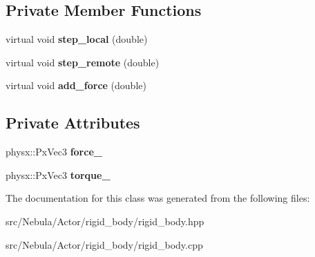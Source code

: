\subsection*{\-Private \-Member \-Functions}
\begin{DoxyCompactItemize}
\item 
\hypertarget{classNeb_1_1Actor_1_1RigidBody_1_1RigidBody_a12da033111e4b0e0a1d8551cd467f461}{virtual void {\bfseries step\-\_\-local} (double)}\label{classNeb_1_1Actor_1_1RigidBody_1_1RigidBody_a12da033111e4b0e0a1d8551cd467f461}

\item 
\hypertarget{classNeb_1_1Actor_1_1RigidBody_1_1RigidBody_ae03a1c6831e7f1d6ee9a85288ec7ba07}{virtual void {\bfseries step\-\_\-remote} (double)}\label{classNeb_1_1Actor_1_1RigidBody_1_1RigidBody_ae03a1c6831e7f1d6ee9a85288ec7ba07}

\item 
\hypertarget{classNeb_1_1Actor_1_1RigidBody_1_1RigidBody_aba7372fdfd817720568fec3cde672d2d}{virtual void {\bfseries add\-\_\-force} (double)}\label{classNeb_1_1Actor_1_1RigidBody_1_1RigidBody_aba7372fdfd817720568fec3cde672d2d}

\end{DoxyCompactItemize}
\subsection*{\-Private \-Attributes}
\begin{DoxyCompactItemize}
\item 
\hypertarget{classNeb_1_1Actor_1_1RigidBody_1_1RigidBody_a28bf823fd850c30e93ae26460db03f82}{physx\-::\-Px\-Vec3 {\bfseries force\-\_\-}}\label{classNeb_1_1Actor_1_1RigidBody_1_1RigidBody_a28bf823fd850c30e93ae26460db03f82}

\item 
\hypertarget{classNeb_1_1Actor_1_1RigidBody_1_1RigidBody_a8f8353b311e864795bb384a950c3b2d1}{physx\-::\-Px\-Vec3 {\bfseries torque\-\_\-}}\label{classNeb_1_1Actor_1_1RigidBody_1_1RigidBody_a8f8353b311e864795bb384a950c3b2d1}

\end{DoxyCompactItemize}


\-The documentation for this class was generated from the following files\-:\begin{DoxyCompactItemize}
\item 
src/\-Nebula/\-Actor/rigid\-\_\-body/rigid\-\_\-body.\-hpp\item 
src/\-Nebula/\-Actor/rigid\-\_\-body/rigid\-\_\-body.\-cpp\end{DoxyCompactItemize}
